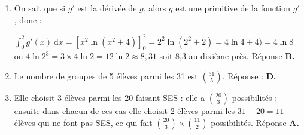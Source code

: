 \begin{enumerate}
Le dessin est clair : la fonction est positive sur l'intervalle[1~;~5] ; l'intégrale est (en unités d'aire) la mesure de la surface limitée par la représentation graphique de $f$, l'axe des abscisses et les droites d'équations $x = 1$ et $x = 5$.

La surface grise contient les 5 carreaux hachurés et est inscrite dans le polygone de 10 unités en bleu. Réponse \textbf{C.}
\item 









On sait que si $g'$ est la dérivée de $g$, alors $g$ est une primitive de la fonction $g'$, donc :

$\displaystyle\int_0^2 g'(x)\:\text{d}x = \left[x^2 \ln \left(x^2 + 4\right)\right]_0^2 = 2^2\ln \left(2^2 + 2 \right) = 4\ln 4 + 4)  = 4\ln 8$ ou $4\ln 2^3 = 3 \times 4 \ln 2 = 12\ln 2 \approx 8,31$ soit 8,3 au dixième près. Réponse \textbf{B.}
	\smallskip
	
\item 
	









Le nombre de groupes de 5 élèves parmi les 31 est $\displaystyle\binom{31}{5}$. Réponse : \textbf{D.}
	\item 
	








	







Elle choisit 3 élèves parmi les 20 faisant SES : elle a $\displaystyle\binom{20}{3}$ possibilités ; ensuite dans chacun de ces cas elle choisit 2 élèves parmi les $31 - 20 = 11$ élèves qui ne font pas SES, ce qui fait $\displaystyle\binom{20}{3} \times \binom{11}{2}$ possibilités. Réponse \textbf{A.}
\end{enumerate}

\bigskip
